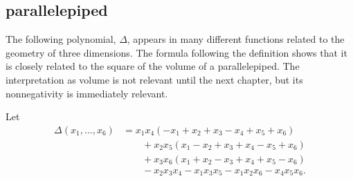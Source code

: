 \subsection{parallelepiped}\label{sec:piped}
%



The following polynomial, $\Delta$, appears in many different
functions related to the geometry of three dimensions.  The formula
following the definition shows that it is closely related to the
square of the volume of a parallelepiped.  The interpretation as
volume is not relevant until the next chapter, but  its nonnegativity is
immediately relevant.  %

\begin{definition}[$\Delta$]\label{def:delta}
  Let
\begin{align*}
\Delta(x_1,\ldots,x_6) &= x_1 x_4 (- x_1+x_2+x_3- x_4+x_5+x_6)\\
&\qquad+x_2 x_5 (x_1- x_2+x_3+x_4- x_5+x_6)\\
&\qquad+x_3 x_6 (x_1+x_2- x_3+x_4+x_5- x_6)\\
&\qquad- x_2 x_3 x_4- x_1 x_3 x_5- x_1 x_2 x_6- x_4 x_5 x_6.
\end{align*}
\end{definition}
%
%

